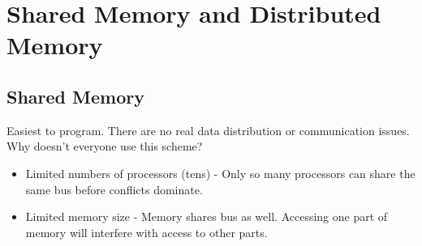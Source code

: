 \documentclass[12pt, a4paper]{book}
\begin{document}
\section{Shared Memory and Distributed Memory}
\subsection{Shared Memory}
\begin{minipage}{0.65\linewidth}
    Easiest to program. There are no
    real data distribution or
    communication issues. Why
    doesn't everyone use this
    scheme?
    \begin{itemize}
        \item Limited numbers of processors
              (tens) - Only so many
              processors can share the same
              bus before conflicts dominate.
        \item Limited memory size -
              Memory shares bus as well.
              Accessing one part of memory
              will interfere with access to
              other parts.
    \end{itemize}
\end{minipage}
\hfill
\end{document}

